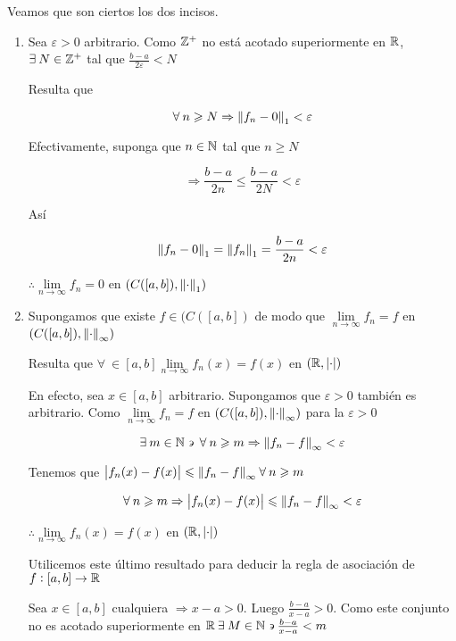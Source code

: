 \begin{proofexplanation}

    Veamos que son ciertos los dos incisos.
    \begin{enumerate}
        \item Sea $\varepsilon > 0$ arbitrario. Como $\mathbb{Z}^+$ no está acotado superiormente en $\mathbb{R}$, $\exists \: N \in \mathbb{Z}^+$ tal que $\frac{b-a}{2\varepsilon} < N$

        Resulta que 

        $$\forall \: n \geqslant N \Rightarrow \norm{f_n-0}_1 < \varepsilon$$

        Efectivamente, suponga que $n \in \mathbb{N}$ tal que $n \geqslant N$

        $$\Rightarrow \frac{b-a}{2n} \leqslant \frac{b-a}{2N} < \varepsilon$$

        Así

        $$\norm{f_n-0}_1 = \norm{f_n}_1 = \frac{b-a}{2n} < \varepsilon$$

        $\therefore \lim\limits_{n \to \infty} f_n = 0$ en $(C([a,b]), \norm{\cdot}_1)$
        \item Supongamos que existe $f \in (C([a,b])$ de modo que $ \lim\limits_{n \to \infty} f_n = f$ en $(C([a,b]), \norm{\cdot}_\infty)$

        Resulta que $\forall \: \in [a,b] \lim\limits_{n \to \infty} f_n(x) = f(x)$ en $(\mathbb{R},\abs{\cdot})$

        En efecto, sea $x \in [a,b]$ arbitrario. Supongamos que $\varepsilon > 0$ también es arbitrario. Como $ \lim\limits_{n \to \infty} f_n = f$ en $(C([a,b]), \norm{\cdot}_\infty)$ para la $\varepsilon > 0$

        $$\exists \: m \in \mathbb{N} \backepsilon \: \forall \: n \geqslant m \Rightarrow \norm{f_n-f}_\infty < \varepsilon$$

        Tenemos que $\abs{f_n(x)-f(x)} \leqslant \norm{f_n-f}_\infty \: \forall \: n \geqslant m$

        $$\forall \: n \geqslant m \Rightarrow \abs{f_n(x)-f(x)} \leqslant \norm{f_n-f}_\infty < \varepsilon$$

        $\therefore  \lim\limits_{n \to \infty} f_n(x) = f(x)$ en $(\mathbb{R},\abs{\cdot})$

        Utilicemos este último resultado para deducir la regla de asociación de $f : [a,b] \to \mathbb{R}$

        Sea $x \in [a,b]$ cualquiera $\Rightarrow x-a > 0$. Luego $\frac{b-a}{x-a} > 0$. Como este conjunto no es acotado superiormente en $\mathbb{R} \: \exists \: M \in \mathbb{N} \backepsilon \frac{b-a}{x-a} < m$


\end{enumerate}
\end{proofexplanation}
